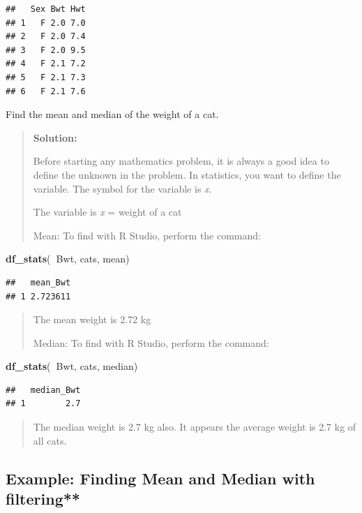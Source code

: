 \documentclass[]{book}
\newenvironment{Shaded}{\begin{snugshade}}{\end{snugshade}}
\newcommand{\KeywordTok}[1]{\textcolor[rgb]{0.13,0.29,0.53}{\textbf{#1}}}
\newcommand{\NormalTok}[1]{#1}
\newcommand{\OperatorTok}[1]{\textcolor[rgb]{0.81,0.36,0.00}{\textbf{#1}}}
\begin{document}
\begin{verbatim}
##   Sex Bwt Hwt
## 1   F 2.0 7.0
## 2   F 2.0 7.4
## 3   F 2.0 9.5
## 4   F 2.1 7.2
## 5   F 2.1 7.3
## 6   F 2.1 7.6
\end{verbatim}

Find the mean and median of the weight of a cat.

\begin{quote}
\textbf{Solution:}

Before starting any mathematics problem, it is always a good idea to define the unknown in the problem. In statistics, you want to define the variable. The symbol for the variable is \emph{x}.

The variable is \emph{x} = weight of a cat

Mean:
To find with R Studio, perform the command:
\end{quote}

\begin{Shaded}
\begin{Highlighting}[]
\KeywordTok{df_stats}\NormalTok{(}\OperatorTok{~}\NormalTok{Bwt, cats, mean)}
\end{Highlighting}
\end{Shaded}

\begin{verbatim}
##   mean_Bwt
## 1 2.723611
\end{verbatim}

\begin{quote}
The mean weight is 2.72 kg

Median:
To find with R Studio, perform the command:
\end{quote}

\begin{Shaded}
\begin{Highlighting}[]
\KeywordTok{df_stats}\NormalTok{(}\OperatorTok{~}\NormalTok{Bwt, cats, median)}
\end{Highlighting}
\end{Shaded}

\begin{verbatim}
##   median_Bwt
## 1        2.7
\end{verbatim}

\begin{quote}
The median weight is 2.7 kg also. It appears the average weight is 2.7 kg of all cats.
\end{quote}

\hypertarget{example-finding-mean-and-median-with-filtering}{%
\subsection{Example: Finding Mean and Median with filtering**}\label{example-finding-mean-and-median-with-filtering}}
\end{document}
